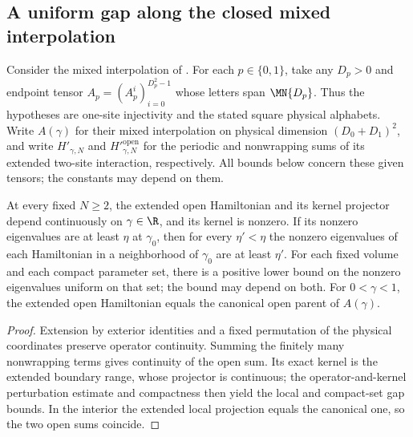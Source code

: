 
\subsection{A uniform gap along the closed mixed interpolation}

Consider the mixed interpolation of \cite[Section~5]{GarreRubio2023MPOSym}.
For each $p\in\{0,1\}$, take any $D_p>0$ and endpoint tensor
$A_p=(A_p^i)_{i=0}^{D_p^2-1}$ whose letters span $\MN{D_p}$.
Thus the hypotheses are one-site injectivity and the stated square
physical alphabets. Write $A(\gamma)$ for their mixed interpolation
on physical dimension $(D_0+D_1)^2$, and write $H'_{\gamma,N}$ and
$H'^{\mathrm{open}}_{\gamma,N}$ for the periodic and nonwrapping sums
of its extended two-site interaction, respectively. All bounds below
concern these given tensors; the constants may depend on them.

\begin{lemma}
    \label{thm:mpo_mixed_open_gap_continuity}
    \leanok
    At every fixed $N\geq2$, the extended open Hamiltonian and its
    kernel projector depend continuously on $\gamma\in\R$, and its
    kernel is nonzero. If its nonzero eigenvalues are at least $\eta$ at
    $\gamma_0$, then for every $\eta'<\eta$ the nonzero eigenvalues of
    each Hamiltonian in a neighborhood of $\gamma_0$ are at least
    $\eta'$. For each fixed volume and each compact parameter set, there
    is a positive lower bound on the nonzero eigenvalues uniform on that
    set; the bound may depend on both. For $0<\gamma<1$, the extended
    open Hamiltonian equals the canonical open parent of $A(\gamma)$.
\end{lemma}
\begin{proof}
    \leanok
    Extension by exterior identities and a fixed permutation of the
    physical coordinates preserve operator continuity. Summing the
    finitely many nonwrapping terms gives continuity of the open sum.
    Its exact kernel is the extended boundary range, whose projector
    is continuous; the operator-and-kernel perturbation estimate and
    compactness then yield the local and compact-set gap bounds. In the
    interior the extended local projection equals the canonical one, so
    the two open sums coincide.
\end{proof}

